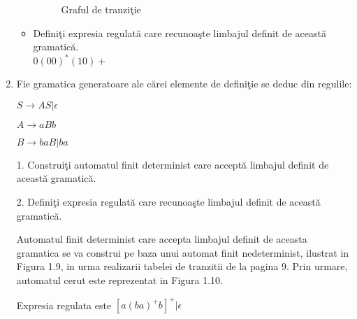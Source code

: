 \begin{enumerate}
\begin{itemize}
\begin{figure}[H]
\caption{Graful de tranziţie}
\end{figure}

\item
Definiţi expresia regulată care recunoaşte limbajul definit de această gramatică.
\\$0(00)^*(10)+$
\end{itemize}

\item
Fie gramatica generatoare ale cărei elemente de definiţie se deduc din regulile:

$S \longrightarrow AS | \epsilon$

$A \longrightarrow aBb$

$B \longrightarrow baB | ba$

1. Construiţi automatul finit determinist care acceptă limbajul definit de această gramatică.

2. Definiţi expresia regulată care recunoaşte limbajul definit de această gramatică.

Automatul finit determinist care accepta limbajul definit de aceasta gramatica se va construi pe baza unui automat finit nedeterminist, ilustrat in Figura 1.9, in urma realizarii tabelei de tranzitii de la pagina 9. Prin urmare, automatul cerut este reprezentat in Figura 1.10.

Expresia regulata este $[a(ba)^+b]^+|\epsilon$

\begin{figure}[H]
\end{figure}
\end{enumerate}
